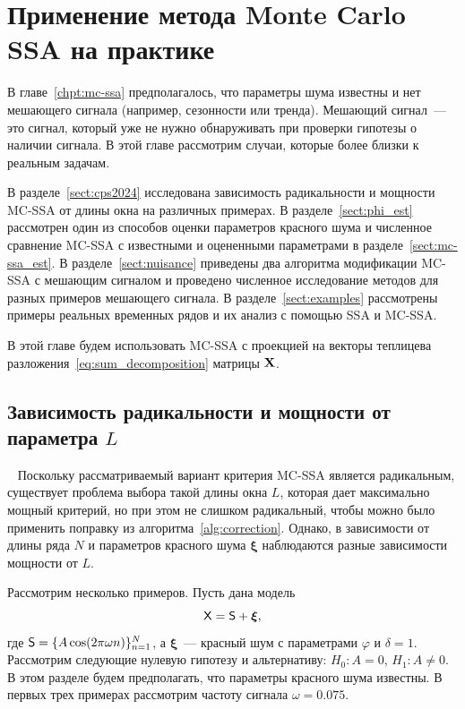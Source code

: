 \documentclass[specialist,
substylefile = spbu.rtx,
               subf,href,colorlinks=true,12pt]{disser}
\theoremstyle{definition}
\newcommand{\bfxi}{\boldsymbol{\xi}}
\begin{document}
\chapter{Применение метода Monte Carlo SSA на практике}\label{chpt:mc_ssa_real}
В главе~\ref{chpt:mc-ssa} предполагалось, что параметры шума известны и нет мешающего сигнала (например, сезонности или тренда). Мешающий сигнал~--- это сигнал, который уже не нужно обнаруживать при проверки гипотезы о наличии сигнала.  В этой главе рассмотрим случаи, которые более близки к реальным задачам.

В разделе~\ref{sect:cps2024} исследована зависимость радикальности и мощности MC-SSA от длины окна на различных примерах. В разделе~\ref{sect:phi_est} рассмотрен один из способов оценки параметров красного шума и численное сравнение MC-SSA с известными и оцененными параметрами в разделе~\ref{sect:mc-ssa_est}. В разделе~\ref{sect:nuisance} приведены два алгоритма модификации MC-SSA с мешающим сигналом и проведено численное исследование методов для разных примеров мешающего сигнала. В разделе~\ref{sect:examples} рассмотрены примеры реальных временных рядов и их анализ с помощью SSA и MC-SSA.

В этой главе будем использовать MC-SSA с проекцией на векторы теплицева разложения~\eqref{eq:sum_decomposition} матрицы $\mathbf{X}$.

\section{Зависимость радикальности и мощности от параметра $L$}~\label{sect:cps2024}
Поскольку рассматриваемый вариант критерия MC-SSA является радикальным, существует проблема выбора такой длины окна $L$, которая дает максимально мощный критерий, но при этом не слишком радикальный, чтобы можно было применить поправку из алгоритма~\ref{alg:correction}. Однако, в зависимости от длины ряда $N$ и параметров красного шума $\bfxi$ наблюдаются разные зависимости мощности от $L$.

Рассмотрим несколько примеров. Пусть дана модель
\[
    \mathsf{X}=\mathsf{S}+{\boldsymbol\xi},
\]
где $\mathsf{S}=\{A\cos(2\pi\omega n)\}_{n=1}^N$, а ${\boldsymbol\xi}$~--- красный шум с параметрами $\varphi$ и $\delta=1$. Рассмотрим следующие нулевую гипотезу и альтернативу: $H_0:A=0$, $H_1:A\ne0$. В этом разделе будем предполагать, что параметры красного шума известны. В первых трех примерах рассмотрим частоту сигнала $\omega = 0.075$.
\end{document}
